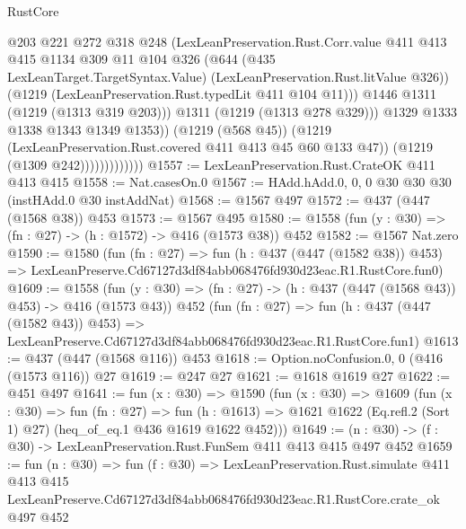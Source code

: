 \begin{lexlean}{RustCore}
\begin{coremodule}
                                  @203
                                  @221
                                  @272
                                  @318
                                  @248
                                  (LexLeanPreservation.Rust.Corr.value
                                    @411
                                    @413
                                    @415
                                    @1134
                                    @309
                                    @11
                                    @104
                                    @326
                                    (@644
                                      (@435 LexLeanTarget.TargetSyntax.Value)
                                      (LexLeanPreservation.Rust.litValue @326))
                                    (@1219 (LexLeanPreservation.Rust.typedLit @411 @104 @11)))
                                  @1446
                                  @1311
                                  (@1219 (@1313 @319 @203)))
                                @1311
                                (@1219 (@1313 @278 @329)))
                              @1329
                              @1333
                              @1338
                              @1343
                              @1349
                              @1353))
                          (@1219 (@568 @45))
                          (@1219 (LexLeanPreservation.Rust.covered @411 @413 @45 @60 @133 @47))
                          (@1219 (@1309 @242)))))))))))))
@1557 := LexLeanPreservation.Rust.CrateOK @411 @413 @415
@1558 := Nat.casesOn.{0}
@1567 := HAdd.hAdd.{0, 0, 0} @30 @30 @30 (instHAdd.{0} @30 instAddNat)
@1568 := @1567 @497
@1572 := @437 (@447 (@1568 @38)) @453
@1573 := @1567 @495
@1580 := @1558 (fun (y : @30) => (fn : @27) -> (h : @1572) -> @416 (@1573 @38)) @452
@1582 := @1567 Nat.zero
@1590 := @1580
    (fun (fn : @27) =>
    fun (h : @437 (@447 (@1582 @38)) @453) =>
    LexLeanPreserve.Cd67127d3df84abb068476fd930d23eac.R1.RustCore.fun0)
@1609 := @1558
    (fun (y : @30) => (fn : @27) -> (h : @437 (@447 (@1568 @43)) @453) -> @416 (@1573 @43))
    @452
    (fun (fn : @27) =>
    fun (h : @437 (@447 (@1582 @43)) @453) =>
    LexLeanPreserve.Cd67127d3df84abb068476fd930d23eac.R1.RustCore.fun1)
@1613 := @437 (@447 (@1568 @116)) @453
@1618 := Option.noConfusion.{0, 0} (@416 (@1573 @116)) @27
@1619 := @247 @27
@1621 := @1618 @1619 @27
@1622 := @451 @497
@1641 := fun (x : @30) =>
  @1590
    (fun (x : @30) =>
    @1609
      (fun (x : @30) =>
      fun (fn : @27) =>
      fun (h : @1613) =>
      @1621 @1622 (Eq.refl.{2} (Sort 1) @27) (heq_of_eq.{1} @436 @1619 @1622 @452)))
@1649 := (n : @30) -> (f : @30) -> LexLeanPreservation.Rust.FunSem @411 @413 @415 @497 @452
@1659 := fun (n : @30) =>
  fun (f : @30) =>
  LexLeanPreservation.Rust.simulate
    @411
    @413
    @415
    LexLeanPreserve.Cd67127d3df84abb068476fd930d23eac.R1.RustCore.crate_ok
    @497
    @452
\end{coremodule}
\end{lexlean}
